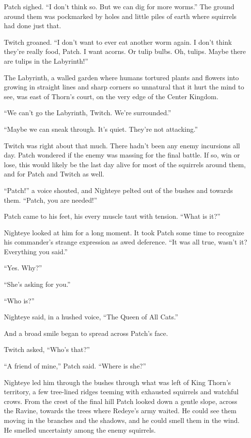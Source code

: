 \documentclass[ebook,oneside,openany,17pt]{memoir}
\newenvironment{tolerant}[1]{%
  \par\tolerance=#1\relax
}{%
  \par
}
\begin{document}
Patch sighed. “I don’t think so. But we can dig for more worms.” The
ground around them was pockmarked by holes and little piles of earth
where squirrels had done just that.

Twitch groaned. “I don’t want to ever eat another worm again. I don’t
think they’re really food, Patch. I want acorns. Or tulip bulbs. Oh,
tulips. Maybe there are tulips in the Labyrinth!”

The Labyrinth, a walled garden where humans tortured plants and
flowers into growing in straight lines and sharp corners so unnatural
that it hurt the mind to see, was east of Thorn’s court, on the very
edge of the Center Kingdom.

“We can’t go the Labyrinth, Twitch. We’re surrounded.”

“Maybe we can sneak through. It’s quiet. They’re not attacking.”

Twitch was right about that much. There hadn’t been any enemy
incursions all day. Patch wondered if the enemy was massing for the
final battle. If so, win or lose, this would likely be the last day
alive for most of the squirrels around them, and for Patch and Twitch
as well.

“Patch!” a voice shouted, and Nighteye pelted out of the bushes and
towards them. “Patch, you are needed!”

Patch came to his feet, his every muscle taut with tension. “What is
it?”

\begin{tolerant}{1000}
Nighteye looked at him for a long moment. It took Patch some time to
recognize his commander’s strange expression as awed deference. “It
was all true, wasn’t it? Everything you said.”
\end{tolerant}

“Yes. Why?”

“She’s asking for you.”

“Who is?”

Nighteye said, in a hushed voice, “The Queen of All Cats.”

And a broad smile began to spread across Patch’s face.

Twitch asked, “Who’s that?”

“A friend of mine,” Patch said. “Where is she?”

\begin{tolerant}{1000}
Nighteye led him through the bushes through what was left of King
Thorn’s territory, a few tree-lined ridges teeming with exhausted
squirrels and watchful crows. From the crest of the final hill Patch
looked down a gentle slope, across the Ravine, towards the trees where
Redeye’s army waited. He could see them moving in the branches and the
shadows, and he could smell them in the wind. He smelled uncertainty
among the enemy squirrels.
\end{tolerant}
\end{document}
